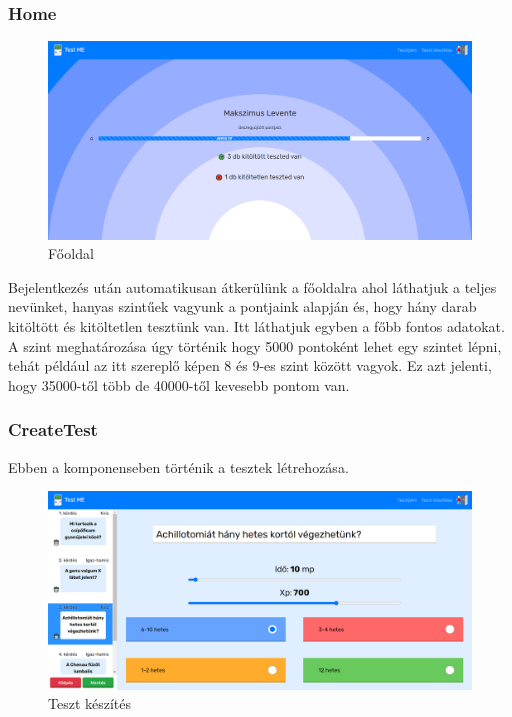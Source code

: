 \subsubsection{Home}

\begin{figure}[H]
    \centering
    \includegraphics[width=\linewidth]{images/home.png}
    \caption{Főoldal}
    \label{fig:home}
\end{figure}

Bejelentkezés után automatikusan átkerülünk a főoldalra  ahol láthatjuk a teljes nevünket, hanyas szintűek vagyunk a pontjaink alapján és, hogy hány darab kitöltött és kitöltetlen tesztünk van. Itt láthatjuk egyben a főbb fontos adatokat. A szint meghatározása úgy történik hogy 5000 pontoként lehet egy szintet lépni, tehát például az itt szereplő képen 8 és 9-es szint között vagyok. Ez azt jelenti, hogy 35000-től több de 40000-től kevesebb pontom van.

\subsubsection{CreateTest}

Ebben a komponenseben történik a tesztek létrehozása.

\begin{figure}[H]
    \centering
    \includegraphics[width=\linewidth]{images/make_test1.png}
    \caption{Teszt készítés}
    \label{fig:make_test1}
\end{figure}

